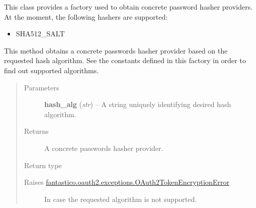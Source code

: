\documentclass[letterpaper,10pt,english]{sphinxmanual}
\begin{document}
\begin{fulllineitems}
\label{features/oauth2/idp:fantastico.oauth2.passwords_hasher_factory.PasswordsHasherFactory}
This class provides a factory used to obtain concrete password hasher providers. At the moment, the following
hashers are supported:
\begin{itemize}
\item {} 
SHA512\_SALT

\end{itemize}

\begin{fulllineitems}
\label{features/oauth2/idp:fantastico.oauth2.passwords_hasher_factory.PasswordsHasherFactory.get_hasher}
This method obtains a concrete passwords hasher provider based on the requested hash algorithm. See the constants
defined in this factory in order to find out supported algorithms.
\begin{quote}\begin{description}
\item[{Parameters}] \leavevmode
\textbf{hash\_alg} (\emph{str}) -- A string uniquely identifying desired hash algorithm.

\item[{Returns}] \leavevmode
A concrete passwords hasher provider.

\item[{Return type}] \leavevmode
{\hyperref[features/oauth2/idp:fantastico.oauth2.passwords_hasher.PasswordsHasher]{}}

\item[{Raises {\hyperref[features/oauth2/technical_summary:fantastico.oauth2.exceptions.OAuth2TokenEncryptionError]{fantastico.oauth2.exceptions.OAuth2TokenEncryptionError}}}] \leavevmode
In case the requested algorithm is not supported.

\end{description}\end{quote}

\end{fulllineitems}


\end{fulllineitems}
\end{document}
